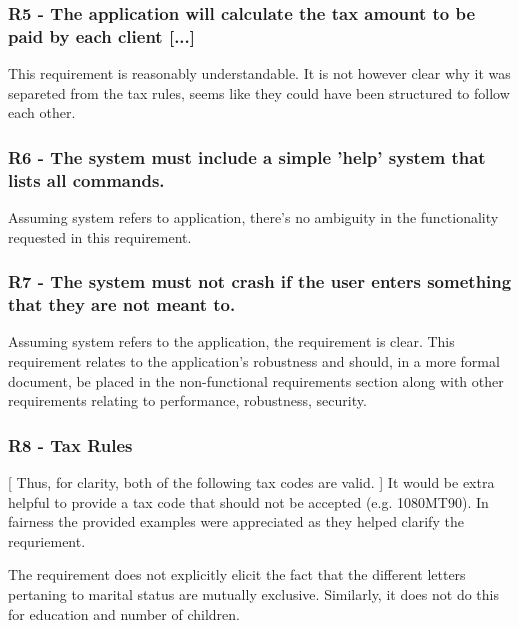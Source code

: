 \subsubsection{R5 - The application will calculate the tax amount to be paid by each client [...]} %

This requirement is reasonably understandable. It is not however clear why it was separeted from the tax rules, seems like they could have been structured to follow each other. 

\subsubsection{R6 - The system must include a simple 'help' system that lists all commands.}
Assuming system refers to application, there's no ambiguity in the functionality requested in this requirement. 

\subsubsection{R7 - The system must not crash if the user enters something that they are not meant to.}
Assuming system refers to the application, the requirement is clear. This requirement relates to the application's robustness and should, in a more formal document, be placed in the non-functional requirements section along with other requirements relating to performance, robustness, security. 

\subsubsection{R8 - Tax Rules}
[ Thus, for clarity, both of the following tax codes are valid. ] 
It would be extra helpful to provide a tax code that should not be accepted (e.g. 1080MT90). In fairness the provided examples were appreciated as they helped clarify the requriement.

The requirement does not explicitly elicit the fact that the different letters pertaning to marital status are mutually exclusive. Similarly, it does not do this for education and number of children. 

